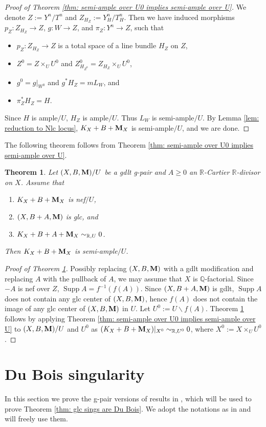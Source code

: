 \documentclass[11pt]{amsart}
\numberwithin{equation}{section}
\newcommand{\Mm}{{\bf{M}}}
\newcommand{\Rr}{\mathbb{R}}
\newcommand{\Supp}{\operatorname{Supp}}
\newtheorem{thm}{Theorem}[section]
\theoremstyle{definition}
\theoremstyle{definition}
\theoremstyle{definition}
\begin{document}
\begin{proof}[Proof of Theorem \ref{thm: semi-ample over U0 implies semi-ample over U}]
We denote $Z:=Y^n/T^n$ and $Z_{H_Z}:=Y^n_H/T^n_H$. Then we have induced morphisms $p_Z: Z_{H_Z}\rightarrow Z$, $g: W\rightarrow Z$, and $\pi_Z: Y^n\rightarrow Z$, such that
\begin{itemize}
\item  $p_Z: Z_{H_Z}\rightarrow Z$ is a total space of a line bundle $H_Z$ on $Z$,
\item $Z^0=Z\times_UU^0$ and $Z^0_{H_{Z^0}}=Z_{H_Z}\times_UU^0$,
\item $g^0=g|_{W^0}$ and $g^*H_Z=mL_W$, and
\item $\pi_Z^*H_Z=H$.
\end{itemize}
Since $H$ is ample$/U$, $H_Z$ is ample$/U$. Thus $L_W$ is semi-ample$/U$. By Lemma \ref{lem: reduction to Nlc locus}, $K_X+B+\Mm_X$ is semi-ample$/U$, and we are done.
\end{proof}

The following theorem follows from Theorem \ref{thm: semi-ample over U0 implies semi-ample over U}.

\begin{thm}\label{thm: nef imply semi-ample}
Let $(X,B,\Mm)/U$ be a gdlt g-pair and $A\geq 0$ an $\mathbb R$-Cartier $\mathbb R$-divisor on $X$. Assume that
\begin{enumerate}
    \item $K_X+B+\Mm_X$ is nef$/U$,
    \item $(X,B+A,\Mm)$ is glc, and
    \item $K_X+B+A+\Mm_X\sim_{\Rr,U}0$.
\end{enumerate}
Then $K_X+B+\Mm_X$ is semi-ample$/U$.
\end{thm}

\begin{proof}[Proof of Theorem \ref{thm: nef imply semi-ample}]
Possibly replacing $(X,B,\Mm)$ with a gdlt modification and replacing $A$ with the pullback of $A$, we may assume that $X$ is $\mathbb Q$-factorial. Since $-A$ is nef over $Z$, $\Supp A=f^{-1}(f(A))$. Since $(X,B+A,\Mm)$ is gdlt, $\Supp A$ does not contain any glc center of $(X,B,\Mm)$, hence $f(A)$ does not contain the image of any glc center of $(X,B,\Mm)$ in $U$. Let $U^0:=U\backslash f(A)$. Theorem \ref{thm: nef imply semi-ample} follows by applying Theorem \ref{thm: semi-ample over U0 implies semi-ample over U} to $(X,B,\Mm)/U$ and $U^0$ as $(K_X+B+\Mm_X)|_{X^0}\sim_{\mathbb R,U^0}0$, where $X^0:=X\times_UU^0$.
\end{proof}



\section{Du Bois singularity}\label{sec: DB singularity}
In this section we prove the g-pair versions of results in \cite[Chapter 6]{Kol13}, which will be used to prove Theorem \ref{thm: glc sings are Du Bois}. We adopt the notations as in \cite[Chapter 6]{Kol13} and will freely use them.
\end{document}
